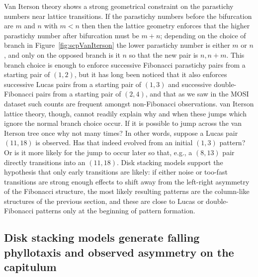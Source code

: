 \documentclass[a4paper,10pt]{amsart}
\begin{document}
Van Iterson theory shows a strong geometrical constraint on the parastichy numbers near lattice transitions. If the parastichy numbers before the bifurcation are $m$ and $n$ with $m<n$ then then the lattice geometry enforces that the higher parastichy number after bifurcation must be $m+n$; depending on the choice of branch in Figure~\ref{fig:scpVanIterson} the lower parastichy number is either $m$ or $n$, and only on the opposed branch is it $n$ so that the new pair is $n,n+m$. This branch choice is enough to enforce successive Fibonacci parastichy pairs from a starting pair of $(1,2)$, but it has long  been noticed that it also enforces successive Lucas pairs from a starting pair of $(1,3)$ and successive double-Fibonacci pairs from a starting pair of $(2,4)$, and that as we saw in the MOSI dataset such counts are frequent amongst non-Fibonacci observations. van Iterson lattice theory, though, cannot readily explain why and when these jumps which  ignore the normal branch choice occur.  If  it is possible to jump across the van Iterson tree once why not many times? In other words, suppose a Lucas pair $(11,18)$ is observed. Has that indeed evolved from an initial $(1,3)$ pattern? Or is it more likely for the jump to occur later so that, e.g., a $(8,13)$ pair directly transitions into an $(11,18)$. 
Disk stacking models support the hypothesis that only early transitions are likely: if either noise or too-fast transitions are strong enough effects to shift away from the left-right asymmetry of the  Fibonacci structure, the most likely resulting patterns are the column-like structures of the previous section, and these are close to Lucas or double-Fibonacci patterns only at the beginning of pattern formation. 


\subsection{Disk stacking models generate falling phyllotaxis and observed asymmetry on the capitulum}
\end{document}
